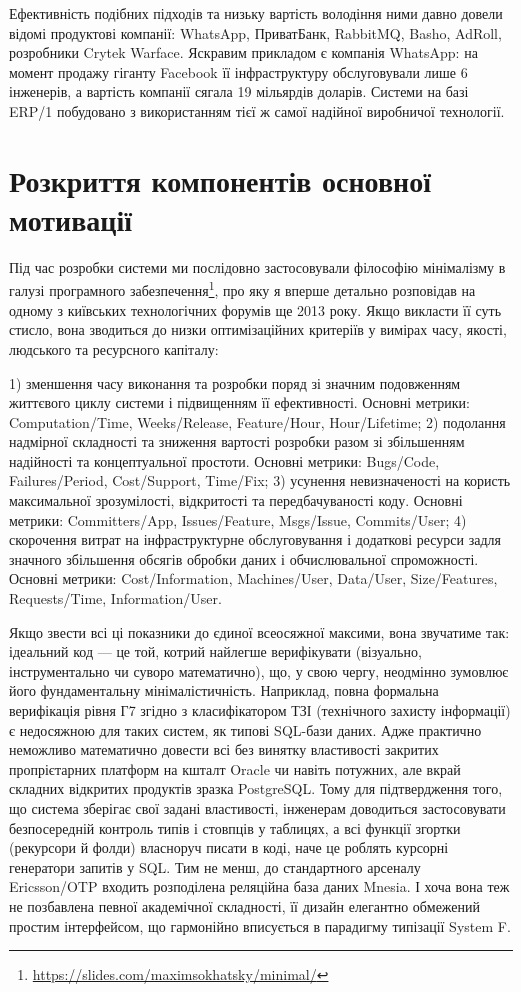 Ефективність подібних підходів та низьку вартість володіння ними давно довели відомі продуктові компанії: WhatsApp, ПриватБанк, RabbitMQ, Basho, AdRoll, розробники Crytek Warface. Яскравим прикладом є компанія WhatsApp: на момент продажу гіганту Facebook її інфраструктуру обслуговували лише 6 інженерів, а вартість компанії сягала 19 мільярдів доларів. Системи на базі ERP/1 побудовано з використанням тієї ж самої надійної виробничої технології.


\section*{Розкриття компонентів основної мотивації}

Під час розробки системи ми послідовно застосовували філософію мінімалізму в галузі програмного забезпечення\footnote{\url{https://slides.com/maximsokhatsky/minimal/}}, про яку я вперше детально розповідав на одному з київських технологічних форумів ще 2013 року. Якщо викласти її суть стисло, вона зводиться до низки оптимізаційних критеріїв у вимірах часу, якості, людського та ресурсного капіталу:

1) зменшення часу виконання та розробки поряд зі значним подовженням життєвого циклу системи і підвищенням її ефективності. Основні метрики: Computation/Time, Weeks/Release, Feature/Hour, Hour/Lifetime;
2) подолання надмірної складності та зниження вартості розробки разом зі збільшенням надійності та концептуальної простоти. Основні метрики: Bugs/Code, Failures/Period, Cost/Support, Time/Fix;
3) усунення невизначеності на користь максимальної зрозумілості, відкритості та передбачуваності коду. Основні метрики: Committers/App, Issues/Feature, Msgs/Issue, Commits/User;
4) скорочення витрат на інфраструктурне обслуговування і додаткові ресурси задля значного збільшення обсягів обробки даних і обчислювальної спроможності. Основні метрики: Cost/Information, Machines/User, Data/User, Size/Features, Requests/Time, Information/User.

Якщо звести всі ці показники до єдиної всеосяжної максими, вона звучатиме так: ідеальний код — це той, котрий найлегше верифікувати (візуально, інструментально чи суворо математично), що, у свою чергу, неодмінно зумовлює його фундаментальну мінімалістичність. Наприклад, повна формальна верифікація рівня Г7 згідно з класифікатором ТЗІ (технічного захисту інформації) є недосяжною для таких систем, як типові SQL-бази даних. Адже практично неможливо математично довести всі без винятку властивості закритих пропрієтарних платформ на кшталт Oracle чи навіть потужних, але вкрай складних відкритих продуктів зразка PostgreSQL. Тому для підтвердження того, що система зберігає свої задані властивості, інженерам доводиться застосовувати безпосередній контроль типів і стовпців у таблицях, а всі функції згортки (рекурсори й фолди) власноруч писати в коді, наче це роблять курсорні генератори запитів у SQL. Тим не менш, до стандартного арсеналу Ericsson/OTP входить розподілена реляційна база даних Mnesia. І хоча вона теж не позбавлена певної академічної складності, її дизайн елегантно обмежений простим інтерфейсом, що гармонійно вписується в парадигму типізації System F.

